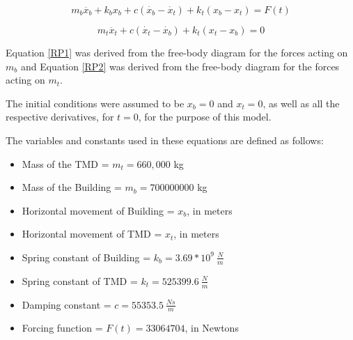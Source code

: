 \documentclass[12pt,twoside,letterpaper]{article}
\begin{document}
\begin{equation}
m_b \ddot{x_b} + k_b x_b + c \left(\dot{x_b} - \dot{x_t}\right) + k_t \left({x_b} - {x_t}\right) = F(t) 
\label{RP1}
\end{equation}

\begin{equation}
m_t \ddot{x_t} + c \left(\dot{x_t} - \dot{x_b}\right) + k_t \left({x_t} - {x_b}\right) = 0
\label{RP2}
\end{equation}
\newline

Equation \ref{RP1} was derived from the free-body diagram for the forces acting on $m_b$ and Equation \ref{RP2} was derived from the free-body diagram for the forces acting on $m_t$. 
\newline

The initial conditions were assumed to be $x_b = 0$ and $x_t = 0$, as well as all the respective derivatives, for $t = 0$, for the purpose of this model.
\newline

The variables and constants used in these equations are defined as follows: 
\begin{itemize}
  \item Mass of the TMD = $m_t=660,000$ kg
  \item Mass of the Building = $m_b = 700000000$ kg
  \item Horizontal movement of Building = $ x_b $, in meters
  \item Horizontal movement of TMD = $ x_t $, in meters
  \item Spring constant of Building = $k_b = 3.69 * 10^9 \: \frac{N}{m} $
  \item Spring constant of TMD = $k_t = 525399.6 \: \frac{N}{m}$
  \item Damping constant = $c = 55353.5 \: \frac{Ns}{m}$
  \item Forcing function = $F(t) = 33064704 $, in Newtons
\end{itemize}
\end{document}
